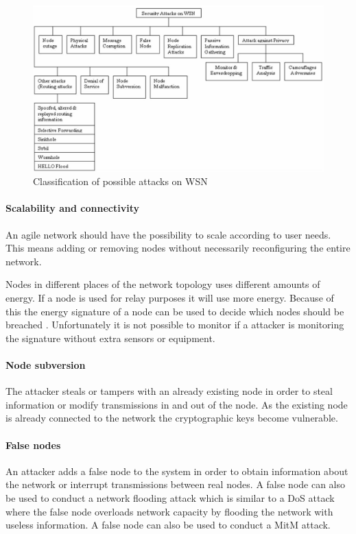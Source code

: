 \begin{figure}[h]
    \centering
    \includegraphics[width=.9\linewidth]{images/attack_classification_WSN.JPG}
    \caption{Classification of possible attacks on WSN \cite{IJCSIS:attack_survey}}
    \label{fig:WSN_attacks}
\end{figure}

\paragraph{Scalability and connectivity} \label{sec:scalability}
An agile network should have the possibility to scale according to user needs. This means adding or removing nodes without necessarily reconfiguring the entire network.

Nodes in different places of the network topology uses different amounts of energy. If a node is used for relay purposes it will use more energy. Because of this the energy signature of a node can be used to decide which nodes should be breached \cite{electronics:topology_control}. Unfortunately it is not possible to monitor if a attacker is monitoring the signature without extra sensors or equipment.

\paragraph{Node subversion} \label{chap:node_tampering}
The attacker steals or tampers with an already existing node in order to steal information or modify transmissions in and out of the node. As the existing node is already connected to the network the cryptographic keys become vulnerable.

\paragraph{False nodes}
An attacker adds a false node to the system in order to obtain information about the network or interrupt transmissions between real nodes. A false node can also be used to conduct a network flooding attack which is similar to a DoS attack where the false node overloads network capacity by flooding the network with useless information. A false node can also be used to conduct a MitM attack. 

